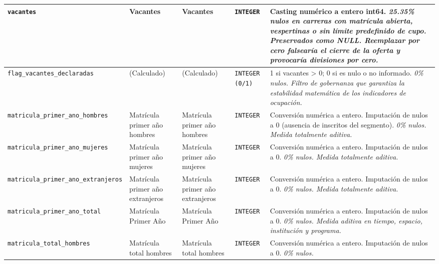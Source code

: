 {\begin{longtable}{|p{3.0cm}|p{2.0cm}|p{2.0cm}|p{1.6cm}|p{6.4cm}|}
\hline
\texttt{\footnotesize vacantes} & Vacantes & Vacantes & \texttt{\footnotesize INTEGER} & Casting numérico a entero int64. \newline \textit{\footnotesize 25.35\% nulos en carreras con matrícula abierta, vespertinas o sin límite predefinido de cupo. Preservados como NULL. Reemplazar por cero falsearía el cierre de la oferta y provocaría divisiones por cero.} \\
\hline
\texttt{\footnotesize flag\_vacantes\_declaradas} & (Calculado) & (Calculado) & \texttt{\footnotesize INTEGER (0/1)} & 1 si vacantes > 0; 0 si es nulo o no informado. \newline \textit{\footnotesize 0\% nulos. Filtro de gobernanza que garantiza la estabilidad matemática de los indicadores de ocupación.} \\
\hline
\texttt{\footnotesize matricula\_primer\_ano\_hombres} & Matrícula primer año hombres & Matrícula primer año hombres & \texttt{\footnotesize INTEGER} & Conversión numérica a entero. Imputación de nulos a 0 (ausencia de inscritos del segmento). \newline \textit{\footnotesize 0\% nulos. Medida totalmente aditiva.} \\
\hline
\texttt{\footnotesize matricula\_primer\_ano\_mujeres} & Matrícula primer año mujeres & Matrícula primer año mujeres & \texttt{\footnotesize INTEGER} & Conversión numérica a entero. Imputación de nulos a 0. \newline \textit{\footnotesize 0\% nulos. Medida totalmente aditiva.} \\
\hline
\texttt{\footnotesize matricula\_primer\_ano\_extranjeros} & Matrícula primer año extranjeros & Matrícula primer año extranjeros & \texttt{\footnotesize INTEGER} & Conversión numérica a entero. Imputación de nulos a 0. \newline \textit{\footnotesize 0\% nulos. Medida totalmente aditiva.} \\
\hline
\texttt{\footnotesize matricula\_primer\_ano\_total} & Matrícula Primer Año & Matrícula Primer Año & \texttt{\footnotesize INTEGER} & Conversión numérica a entero. Imputación de nulos a 0. \newline \textit{\footnotesize 0\% nulos. Medida aditiva en tiempo, espacio, institución y programa.} \\
\hline
\texttt{\footnotesize matricula\_total\_hombres} & Matrícula total hombres & Matrícula total hombres & \texttt{\footnotesize INTEGER} & Conversión numérica a entero. Imputación de nulos a 0. \newline \textit{\footnotesize 0\% nulos.} \\

\end{longtable}}
